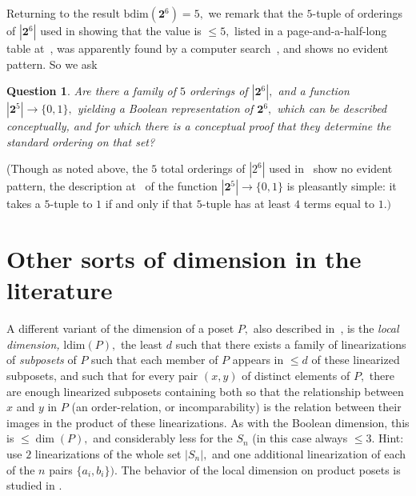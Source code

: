 \documentclass{amsart}
\newtheorem{question}[theorem]{Question}
\numberwithin{equation}{section}
\numberwithin{theorem}{section}
\renewcommand{\r}{\mathrm}
\newcommand{\2}{\mathbf{2}}
\begin{document}
Returning to the result $\r{bdim}(\2^6)=5,$
we remark that the $\!5\!$-tuple of orderings of $|\2^6|$ used in
showing that the value is $\leq 5,$ listed in a page-and-a-half-long
table at~\cite[pp.30-31]{5/6}, was apparently found by a
computer search~\cite[last paragraph of p.29]{5/6}, and
shows no evident pattern.
So we ask

\begin{question}\label{Q.5/6}
Are there a family of $5$ orderings of $|\2^6|,$
and a function $|\2^5|\to\{0,1\},$ yielding a Boolean
representation of $\2^6,$ which can be described conceptually,
and for which there is a conceptual proof that they
determine the standard ordering on that set?
\end{question}

(Though as noted above, the $5$ total orderings
of $|2^6|$ used in~\cite{5/6} show no evident pattern,
the description at~\cite[next-to-last paragraph of p.29]{5/6}
of the function $|\2^5|\to\{0,1\}$ is pleasantly simple:
it takes a $\!5\!$-tuple to $1$ if and only if that
$\!5\!$-tuple has at least $4$ terms equal to $1.)$

\section{Other sorts of dimension in the literature}\label{S.other}

A different variant of the dimension of a
poset $P,$ also described in~\cite{comparing}, is
the {\em local dimension,} $\r{ldim}(P),$ the least $d$ such that
there exists a family of linearizations of {\em subposets} of $P$
such that each member of $P$ appears in $\leq d$ of these linearized
subposets, and such that for every pair
$(x,y)$ of distinct elements of $P,$ there are
enough linearized subposets containing both so that the
relationship between $x$ and $y$ in $P$ (an order-relation, or
incomparability) is the relation between their images in the
product of these linearizations.
As with the Boolean dimension, this is $\leq\dim(P),$ and
considerably less for the $S_n$ (in this case always $\leq 3.$
Hint: use $2$ linearizations of the whole set $|S_n|,$
and one additional linearization of each of the $n$
pairs $\{a_i,b_i\}).$
The behavior of the local dimension on product posets
is studied in \cite[\S3]{KMMSSUW}.
\end{document}
